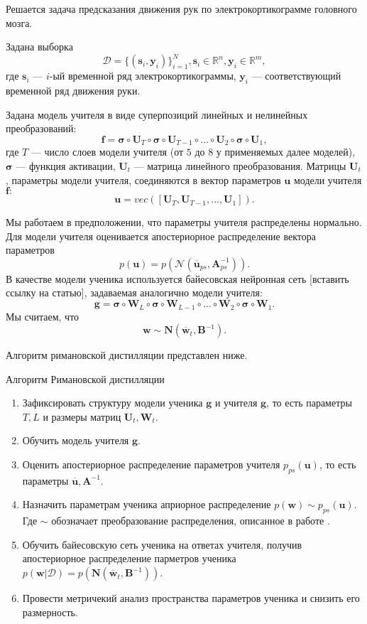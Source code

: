 \documentclass[12pt, twoside]{article}
\begin{document}
Решается задача предсказания движения рук по электрокортикограмме головного мозга.


Задана выборка \[\mathcal{D} = \{(\mathbf{s}_i, \mathbf{y}_i)\}_{i=1}^N, \mathbf{s}_i \in \mathbb{R}^n, \mathbf{y}_i \in \mathbb{R}^m,\] где $\mathbf{s}_i$ --- $i$-ый временной ряд электрокортикограммы, $\mathbf{y}_i$ --- соответствующий временной ряд движения руки.

Задана модель учителя в виде суперпозиций линейных и нелинейных преобразований: \[ 
\mathbf{f} = \mathbf{\sigma} \circ \mathbf{U}_T \circ \mathbf{\sigma} \circ \mathbf{U}_{T-1} \circ \dots \circ \mathbf{U}_2 \circ \mathbf{\sigma} \circ \mathbf{U}_1,
\] где $T$ --- число слоев модели учителя (от $5$ до $8$ у применяемых далее моделей), $\mathbf{\sigma}$ --- функция активации, $\mathbf{U}_t$ --- матрица линейного преобразования. Матрицы $\mathbf{U}_t$, параметры модели учителя, соединяются в вектор параметров $\mathbf{u}$ модели учителя $\mathbf{f}:$ 
\[
\mathbf{u} = vec([\mathbf{U}_T, \mathbf{U}_{T-1}, \dots, \mathbf{U}_{1}]).
\]

Мы работаем в предположении, что параметры учителя распределены нормально.
Для модели учителя оценивается апостериорное распределение вектора параметров \[p(\mathbf{u}) = p(\mathcal{N}(\mathbf{\overline{u}}_{ps}, \mathbf{A}_{ps}^{-1})).\]
В качестве модели ученика используется байесовская нейронная сеть [вставить ссылку на статью], задаваемая аналогично модели учителя:
\[
\mathbf{g} = \mathbf{\sigma} \circ \mathbf{W}_L \circ \mathbf{\sigma} \circ \mathbf{W}_{L-1} \circ \dots \circ \mathbf{W}_2 \circ \mathbf{\sigma} \circ \mathbf{W}_1.
\]
Мы считаем, что \[\mathbf{w} \sim \mathbf{N}(\mathbf{\overline{w}}_t, \mathbf{B}^{-1}).\] 

Алгоритм римановской дистилляции представлен ниже.

\begin{algorithm}[H] 
         \caption{Алгоритм Римановской дистилляции}\label{alg:riman_distil} 
         \begin{enumerate}
             \item Зафиксировать структуру модели ученика $\mathbf{g}$ и учителя $\mathbf{g}$, то есть параметры $T, L$ и размеры матриц $\mathbf{U}_t, \mathbf{W}_t$.
             \item Обучить модель учителя $\mathbf{g}$.
            \item Оценить апостериорное распределение параметров учителя $p_{ps}(\mathbf{u})$, то есть параметры $\mathbf{\overline{u}}, \mathbf{A}^{-1}$.
            \item Назначить параметрам ученика априорное распределение $p(\mathbf{w}) \sim p_{ps}(\mathbf{u})$. Где $\sim$ обозначает преобразование распределения, описанное в работе \citep{grabovoy2021bayesian}.
            \item Обучить байесовскую сеть ученика на ответах учителя, получив апостериорное распределение парметров ученика $p(\mathbf{w}|\mathcal{D}) = p(\mathbf{N}(\mathbf{\overline{w}}_t, \mathbf{B}^{-1}))$.
            \item Провести метричекий анализ пространства параметров ученика и снизить его размерность.
         \end{enumerate}
 \end{algorithm}
\end{document}
